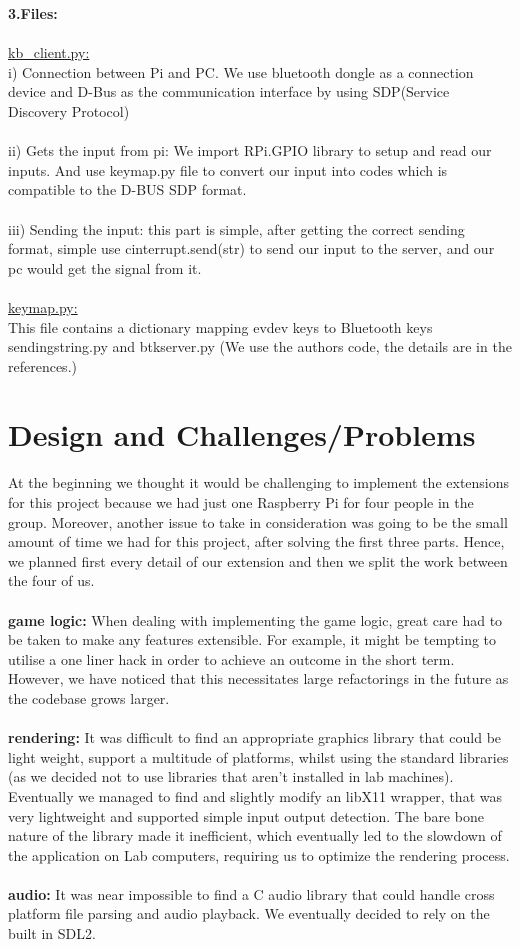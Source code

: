 \documentclass[a4paper]{article}
\begin{document}
\setlength{\parindent}{0cm}
\textbf{3.Files:} \\\\
\underline{kb\_client.py:}\\
\quad  i) Connection between Pi and PC. We use bluetooth dongle as a connection device and D-Bus as the communication interface by using SDP(Service Discovery Protocol)
\\\\
ii) Gets the input from pi: We import RPi.GPIO library to setup and read our inputs. And use keymap.py file to convert our input into codes which is compatible to the D-BUS SDP format.
\\\\
iii) Sending the input:	this part is simple, after getting the correct sending format, simple use cinterrupt.send(str) to send our input to the server, and our pc would get the signal from it.
\\\\
\underline{keymap.py:} \\This file contains a dictionary mapping evdev keys to Bluetooth keys 
sendingstring.py and btkserver.py (We use the authors code, the details are in the references.)
\section{Design and Challenges/Problems}
At the beginning we thought it would be challenging to implement the extensions for this project because we had just one Raspberry Pi for four people in the group. 
Moreover, another issue to take in consideration was going to be the small amount of time we had for this project, after solving the first three parts. Hence, we planned first every detail of our extension and then we split the work between the four of us.
\\\\
\textbf{game logic:} When dealing with implementing the game logic, great care had to be taken to make any features extensible. For example, it might be tempting to utilise a one liner hack in order to achieve an outcome in the short term. However, we have noticed that this necessitates large refactorings in the future as the codebase grows larger.
\\\\
\textbf{rendering:} It was difficult to find an appropriate graphics library that could be light weight, support a multitude of platforms, whilst using the standard libraries (as we decided not to use libraries that aren't installed in lab machines). Eventually we managed to find and slightly modify an libX11 wrapper, that was very lightweight and supported simple input output detection. The bare bone nature of the library made it inefficient, which eventually led to the slowdown of the application on Lab computers, requiring us to optimize the rendering process. 
\\\\
\textbf{audio:} It was near impossible to find a C audio library that could handle cross platform file parsing and audio playback. We eventually decided to rely on the built in SDL2.
\end{document}
